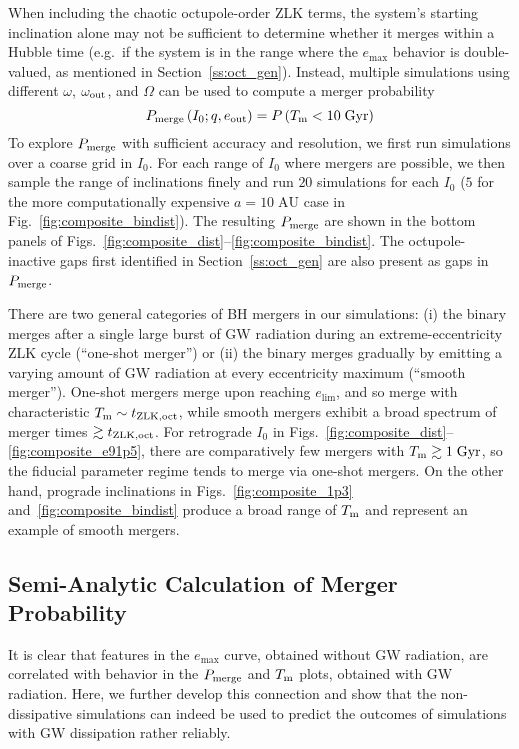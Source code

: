 \documentclass[
        fleqn,
        usenatbib,
    ]{mnras}
\newcommand*{\p}[1]{\left(#1\right)}
\begin{document}
When including the chaotic octupole-order ZLK terms, the system's starting
inclination alone may not be sufficient to determine whether it merges within a
Hubble time (e.g.\ if the system is in the range where the $e_{\max}$ behavior
is double-valued, as mentioned in Section~\ref{ss:oct_gen}). Instead, multiple
simulations using different $\omega$, $\omega_{\rm out}$, and $\Omega$ can be
used to compute a merger probability
\begin{equation}
    P_{\rm merge}\p{I_0; q, e_{\rm out}} = P\p{T_{\rm m} < 10\;\mathrm{Gyr}}
        \label{eq:def_pmerge}
\end{equation}
To explore $P_{\rm merge}$ with sufficient accuracy and resolution, we first run
simulations over a coarse grid in $I_0$. For each range of $I_0$ where mergers
are possible, we then sample the range of inclinations finely and run $20$
simulations for each $I_0$ ($5$ for the more computationally expensive $a =
10\;\mathrm{AU}$ case in Fig.~\ref{fig:composite_bindist}). The resulting
$P_{\rm merge}$  are shown in the bottom panels of
Figs.~\ref{fig:composite_dist}--\ref{fig:composite_bindist}. The
octupole-inactive gaps first identified in Section~\ref{ss:oct_gen} are also
present as gaps in $P_{\rm merge}$.

There are two general categories of BH mergers in our simulations: (i) the
binary merges after a single large burst of GW radiation during an
extreme-eccentricity ZLK cycle (``one-shot merger'') or (ii) the binary merges
gradually by emitting a varying amount of GW radiation at every eccentricity
maximum (``smooth merger''). One-shot mergers merge upon reaching $e_{\lim}$,
and so merge with characteristic $T_{\rm m} \sim t_{\rm ZLK, oct}$, while smooth
mergers exhibit a broad spectrum of merger times $\gtrsim t_{\rm ZLK, oct}$. For
retrograde $I_0$ in Figs.~\ref{fig:composite_dist}--\ref{fig:composite_e91p5},
there are comparatively few mergers with $T_{\rm m} \gtrsim 1\;\mathrm{Gyr}$, so
the fiducial parameter regime tends to merge via one-shot mergers. On the other
hand, prograde inclinations in Figs.~\ref{fig:composite_1p3}
and~\ref{fig:composite_bindist} produce a broad range of $T_{\rm m}$ and
represent an example of smooth mergers.

\subsection{Semi-Analytic Calculation of Merger
Probability}\label{ss:nogw_merger}

It is clear that features in the $e_{\max}$ curve, obtained without GW
radiation, are correlated with behavior in the $P_{\rm merge}$ and $T_{\rm m}$
plots, obtained with GW radiation. Here, we further develop this connection and
show that the non-dissipative simulations can indeed be used to predict the
outcomes of simulations with GW dissipation rather reliably.
\end{document}
